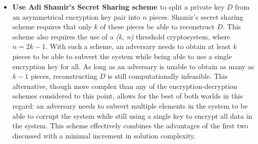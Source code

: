 \documentclass[./4_GeneralApproach.tex]{subfiles}
\begin{document}
\begin{itemize}
        \item{\textbf{Use Adi Shamir's Secret Sharing scheme \cite{Shamir1979}} to split a private key $ D $ from an asymmetrical encryption key pair into $ n $ pieces. Shamir's secret sharing scheme requires that only $ k $ of these pieces be able to reconstruct $ D $. This scheme also requires the use of a \textit{(k, n)} threshold cryptosystem, where $ n = 2k - 1 $. With such a scheme, an adversary needs to obtain at least $ k $ pieces to be able to subvert the system while being able to use a single encryption key for all. As long as an adversary is unable to obtain as many as $ k - 1 $ pieces, reconstructing $ D $ is still computationally infeasible. This alternative, though more complex than any of the encryption-decryption schemes considered to this point, allows for the best of both worlds in this regard: an adversary needs to subvert multiple elements in the system to be able to corrupt the system while still using a single key to encrypt all data in the system. This scheme effectively combines the advantages of the first two discussed with a minimal increment in solution complexity.}
    \end{itemize}
\end{document}
